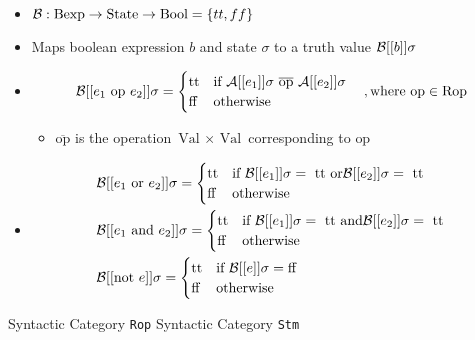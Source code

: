 \begin{itemize}
\begin{itemize}
\begin{itemize}
                    \item $\mathcal{B}: \text{Bexp} \to \text{State} \to \text{Bool} = \{tt, ff\} $
                    \item Maps boolean expression $b$ and state $\sigma$ to a truth value $\mathcal{B}[[b]]\sigma$
                    \item
                        \[
                            \mc{B}[[e_1 \text{ op } e_2]] \sigma =
\begin{cases}
    \text{tt} &\text{if } \mc{A}[[e_1]] \sigma \ \overline{\text{op}} \ \mc{A}[[e_2]] \sigma\\
    \text{ff} &\text{otherwise}
\end{cases}\quad ,\text{where op} \in \text{Rop}
                        \]
                        \begin{itemize}
                            \item $\overline{\text{op}}$ is the operation $\text{Val } \times \text{ Val}$ corresponding to $\text{op}$
                        \end{itemize}
                    \item
                        \begin{align*}
                            &\mathcal{B}[[e_1 \text{ or } e_2]] \sigma =
\begin{cases}
    \text{tt} &\text{if } \mathcal{B}[[e_1]] \sigma = \text{ tt or} \mathcal{B}[[e_2]] \sigma = \text{ tt}\\
    \text{ff} &\text{otherwise}
\end{cases}\\
                            &\mathcal{B}[[e_1 \text{ and } e_2]] \sigma =
\begin{cases}
    \text{tt} &\text{if } \mathcal{B}[[e_1]] \sigma = \text{ tt and} \mathcal{B}[[e_2]] \sigma = \text{ tt}\\
    \text{ff} &\text{otherwise}
\end{cases}\\
                            &\mathcal{B}[[\text{not } e]] \sigma =
\begin{cases}
    \text{tt} &\text{if } \mathcal{B}[[e]] \sigma = \text{ff}\\
    \text{ff} &\text{otherwise}
\end{cases}\\
                        \end{align*}
                \end{itemize}
             Syntactic Category \verb+Rop+
             Syntactic Category \verb+Stm+
        \end{itemize}
\end{itemize}

